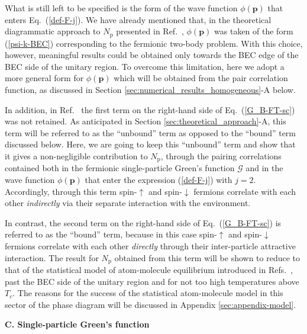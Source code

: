 \documentclass[pra,twocolumn,aps,amssymb,showpacs,superscriptaddress]{revtex4-1}
\begin{document}
What is still left to be specified is the form of the wave function $\phi(\mathbf{p})$ that enters Eq.~(\ref{def-F-j}).
We have already mentioned that, in the theoretical diagrammatic approach to $N_{\mathrm{p}}$ presented in Ref.~\cite{Ulm-Cam-2019}, $\phi(\mathbf{p})$ was taken of the form (\ref{psi-k-BEC})
corresponding to the fermionic two-body problem.
With this choice, however, meaningful results could be obtained only towards the BEC edge of the BEC side of the unitary region.
To overcome this limitation, here we adopt a more general form for $\phi(\mathbf{p})$ which will be obtained from the pair correlation function, as discussed in Section \ref{sec:numerical_results_homogeneous}-A below.

In addition, in Ref.~\cite{Ulm-Cam-2019} the first term on the right-hand side of Eq.~(\ref{G_B-FT-sc}) was not retained.
As anticipated in Section \ref{sec:theoretical_approach}-A, this term will be referred to as the ``unbound'' term as opposed to the ``bound'' term discussed below.
Here, we are going to keep this ``unbound'' term and show that it gives a non-negligible contribution to $N_{\mathrm{p}}$, through the pairing correlations contained both in the fermionic single-particle Green's function 
$\mathcal{G}$ and in the wave function $\phi(\mathbf{p})$ that enter the expression (\ref{def-F-j}) with $j=2$.
Accordingly, through this term spin-$\uparrow$ and spin-$\downarrow$ fermions correlate with each other \emph{indirectly} via their separate interaction with the environment.

In contrast, the second term on the right-hand side of Eq.~(\ref{G_B-FT-sc}) is referred to as the ``bound'' term, because in this case spin-$\uparrow$ and spin-$\downarrow$ fermions correlate with each other \emph{directly} through their inter-particle attractive interaction.
The result for $N_{\mathrm{p}}$ obtained from this term will be shown to reduce to that of the statistical model of atom-molecule equilibrium introduced in Refs.~\cite{Chin-Grimm-2004,Eagles-1969}, past the BEC side of the unitary region and for not too high temperatures above $T_{c}$.
The reasons for the success of the statistical atom-molecule model in this sector of the phase diagram will be discussed in Appendix \ref{sec:appendix-model}.

\vspace{0.05cm}
\begin{center}
{\bf C. Single-particle Green's function}
\end{center}
\end{document}
